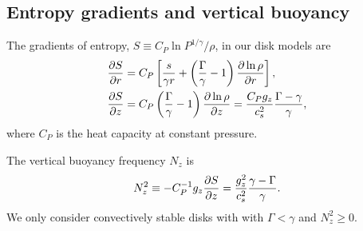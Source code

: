 \subsection{Entropy gradients and vertical buoyancy}
The gradients of entropy, $S\equiv
C_P\ln{P^{1/\gamma}/\rho}$, in our disk models are
\begin{subequations}
\begin{align}
  &\frac{\partial S}{\partial r} = C_P\left[\frac{s}{\gamma r} +
    \left(\frac{\Gamma}{\gamma}-1\right)\frac{\partial \ln{\rho}}{\partial
       r}\right], \label{dSdr}\\
  &\frac{\partial S}{\partial z} = C_P
  \left(\frac{\Gamma}{\gamma}-1\right)\frac{\partial \ln{\rho}}{\partial z} = {C_P g_z \over c_s^2} {\Gamma - \gamma \over \gamma},\label{dSdz}
\end{align} 
\end{subequations}
 where $C_P$ is the heat capacity at
constant pressure. 

The vertical buoyancy frequency $N_z$ is 
\begin{align}
  N_z^2 \equiv - C_P^{-1}g_z \frac{\p S}{\p z} = {g_z^2 \over c_s^2}{\gamma - \Gamma \over \gamma}. %
    \label{nzsq_def}
\end{align}
We only consider convectively stable disks with with $\Gamma <
\gamma$ and  $N_z^2\geq0$. %

